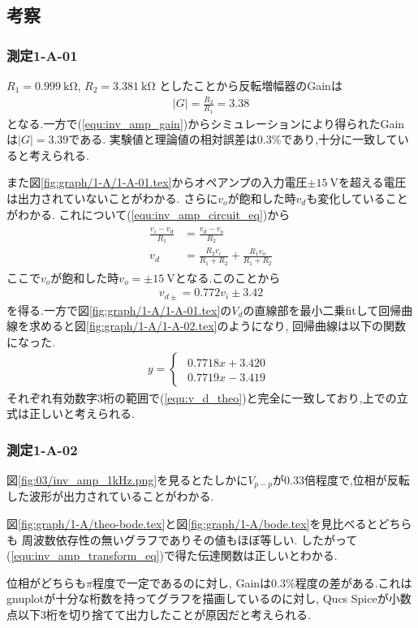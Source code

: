 \subsection{考察}
\subsubsection{測定1-A-01}
$R_1=0.999\ \si{\kilo\ohm}$, $R_2=3.381\ \si{\kilo\ohm}$
としたことから反転増幅器のGainは
\begin{align}
  |G|=\frac{R_2}{R_1}=3.38
\end{align}
となる.一方で(\ref{equ:inv_amp_gain})からシミュレーションにより得られたGainは$|G|=3.39$である.
実験値と理論値の相対誤差は$0.3\%$であり,十分に一致していると考えられる.

また図\ref{fig:graph/1-A/1-A-01.tex}からオペアンプの入力電圧$\pm15\ \si{\volt}$を超える電圧は出力されていないことがわかる.
さらに$v_o$が飽和した時$v_d$も変化していることがわかる.
これについて(\ref{equ:inv_amp_circuit_eq})から
\begin{align}
  \begin{split}
    \frac{v_i-v_d}{R_1}&=\frac{v_d-v_o}{R_2}\\
    v_d&=\frac{R_2v_i}{R_1+R_2}+\frac{R_1v_o}{R_1+R_2}
  \end{split}
\end{align}
ここで$v_o$が飽和した時$v_o=\pm15\ \si{\volt}$となる.このことから
\begin{align}
  \label{equ:v_d_theo}
  v_{d\pm}=0.772v_i\pm3.42
\end{align}
を得る.一方で図\ref{fig:graph/1-A/1-A-01.tex}の$V_d$の直線部を最小二乗fitして回帰曲線を求めると図\ref{fig:graph/1-A/1-A-02.tex}のようになり,
回帰曲線は以下の関数になった.
\begin{align}
  y=
  \begin{cases}
    \begin{split}
      0.7718x+3.420\\
      0.7719x-3.419
    \end{split}
  \end{cases}
\end{align}
それぞれ有効数字3桁の範囲で(\ref{equ:v_d_theo})と完全に一致しており,上での立式は正しいと考えられる.
\subsubsection{測定1-A-02}
図\ref{fig:03/inv_amp_1kHz.png}を見るとたしかに$V_{p-p}$が0.33倍程度で,位相が反転した波形が出力されていることがわかる.

図\ref{fig:graph/1-A/theo-bode.tex}と図\ref{fig:graph/1-A/bode.tex}を見比べるとどちらも
周波数依存性の無いグラフでありその値もほぼ等しい.
したがって(\ref{equ:inv_amp_transform_eq})で得た伝達関数は正しいとわかる.

位相がどちらも$\pi$程度で一定であるのに対し,
Gainは$0.3\%$程度の差がある.これはgnuplotが十分な桁数を持ってグラフを描画しているのに対し,
Qucs Spiceが小数点以下3桁を切り捨てて出力したことが原因だと考えられる.